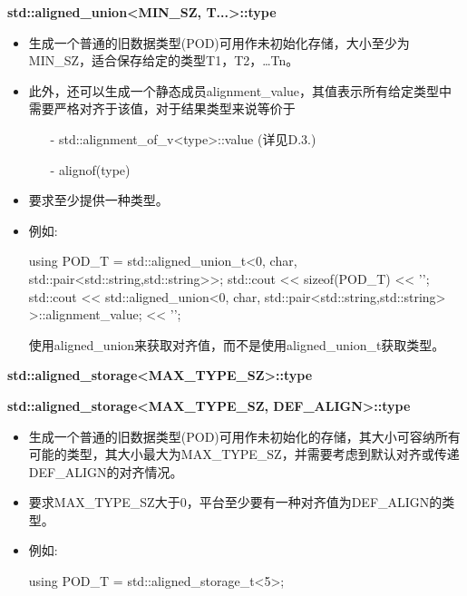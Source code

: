 \textbf{std::aligned\_union<MIN\_SZ, T...>::type}

\begin{itemize}
\item
生成一个普通的旧数据类型(POD)可用作未初始化存储，大小至少为MIN\_SZ，适合保存给定的类型T1，T2，…Tn。

\item
此外，还可以生成一个静态成员alignment\_value，其值表示所有给定类型中需要严格对齐于该值，对于结果类型来说等价于

\begin{itemize}
\item[-]
std::alignment\_of\_v<type>::value (详见D.3.)

\item[-]
alignof(type)
\end{itemize}

\item
要求至少提供一种类型。

\item
例如:
\begin{cpp}
using POD_T = std::aligned_union_t<0, char,
								std::pair<std::string,std::string>>;
std::cout << sizeof(POD_T) << ’\n’;
std::cout << std::aligned_union<0, char,
								std::pair<std::string,std::string>
								>::alignment_value;
		<< ’\n’;
\end{cpp}

使用aligned\_union来获取对齐值，而不是使用aligned\_union\_t获取类型。
\end{itemize}

\textbf{std::aligned\_storage<MAX\_TYPE\_SZ>::type}

\textbf{std::aligned\_storage<MAX\_TYPE\_SZ, DEF\_ALIGN>::type}

\begin{itemize}
\item
生成一个普通的旧数据类型(POD)可用作未初始化的存储，其大小可容纳所有可能的类型，其大小最大为MAX\_TYPE\_SZ，并需要考虑到默认对齐或传递DEF\_ALIGN的对齐情况。

\item
要求MAX\_TYPE\_SZ大于0，平台至少要有一种对齐值为DEF\_ALIGN的类型。

\item
例如:
\begin{cpp}
using POD_T = std::aligned_storage_t<5>;
\end{cpp}
\end{itemize}













